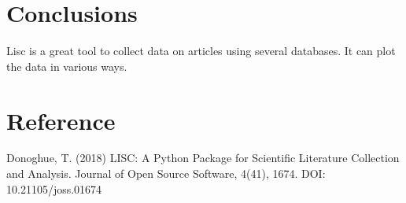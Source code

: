 \documentclass{article}
\begin{document}
\section{Conclusions}

Lisc is a great tool to collect data on articles using several databases. It can plot the data in various ways.

\section{Reference}

Donoghue, T. (2018) LISC: A Python Package for Scientific Literature Collection and Analysis. Journal of Open Source Software, 4(41), 1674. DOI: 10.21105/joss.01674
\end{document}
